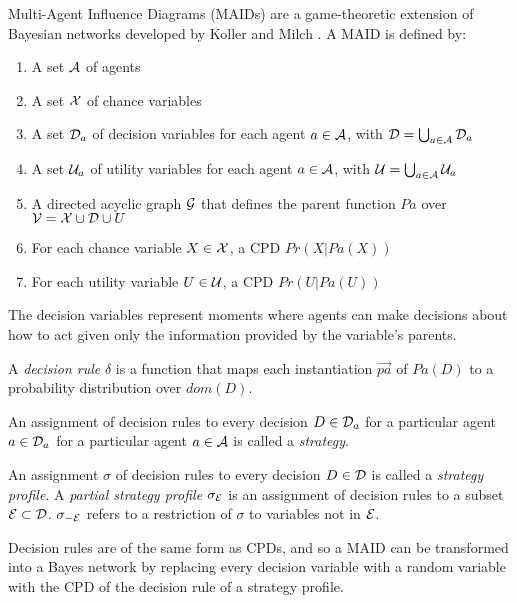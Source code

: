 \documentclass[../thesis.tex]{subfiles}
\begin{document}
Multi-Agent Influence Diagrams (MAIDs) are a game-theoretic
extension of Bayesian networks developed by Koller and Milch
\cite{koller2003multi}.
A MAID is defined by:
\begin{enumerate}
\item A set $\mathcal{A}$ of agents 
\item A set $\mathcal{X}$ of chance variables
\item A set $\mathcal{D}_a$ of decision variables for each agent $a \in \mathcal{A}$,
  with $\mathcal{D} = \bigcup_{a \in \mathcal{A}} \mathcal{D}_a$
\item A set $\mathcal{U}_a$ of utility variables for each agent $a \in \mathcal{A}$,
  with $\mathcal{U} = \bigcup_{a \in \mathcal{A}} \mathcal{U}_a$
\item A directed acyclic graph $\mathcal{G}$ that defines the parent function
  $Pa$ over $\mathcal{V} = \mathcal{X} \cup \mathcal{D} \cup{U}$
\item For each chance variable $X \in \mathcal{X}$, a CPD $Pr(X \vert Pa(X))$
\item For each utility variable $U \in \mathcal{U}$, a CPD $Pr(U \vert Pa(U))$
\end{enumerate}

The decision variables represent moments where agents can
make decisions about how to act given only the information
provided by the variable's parents.

\begin{dfn}
  \label{dfn:decision-rule}
  A \emph{decision rule} $\delta$ is a function that maps each instantiation
  $\vec{pa}$ of $Pa(D)$ to a probability distribution over $dom(D)$.
\end{dfn}

\begin{dfn}[Strategy]
  \label{dfn:strategy}
  An assignment of decision rules to every decision $D \in \mathcal{D}_a$
  for a particular agent $a \in \mathcal{D}_a$ for a particular agent
  $a \in \mathcal{A}$ is called a \emph{strategy}.
\end{dfn}

\begin{dfn}
  An assignment $\sigma$ of decision rules to every decision
  $D \in \mathcal{D}$ is called a \emph{strategy profile}.
  A \emph{partial strategy profile} $\sigma_\mathcal{E}$ is
  an assignment of decision rules to a subset $\mathcal{E} \subset \mathcal{D}$.
  $\sigma_{-\mathcal{E}}$ refers to a restriction of $\sigma$ to variables
  not in $\mathcal{E}$.
\end{dfn}

Decision rules are of the same form as CPDs, and so a MAID
can be transformed into a Bayes network by replacing every
decision variable with a random variable with the CPD of the
decision rule of a strategy profile.
\end{document}
